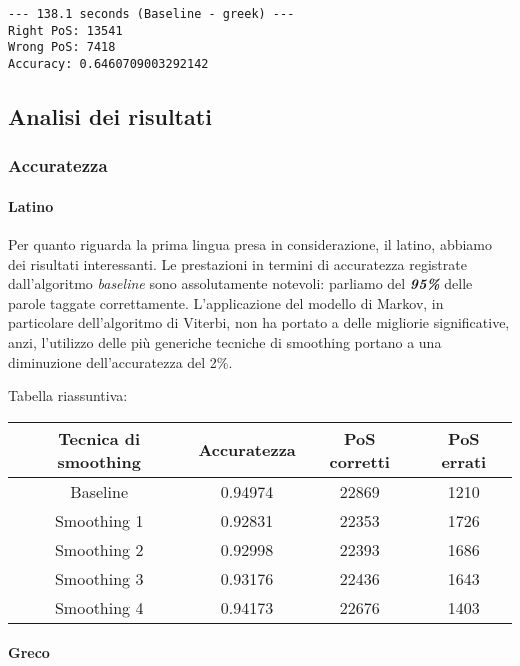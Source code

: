 \documentclass[11pt]{article}
\begin{document}
    \begin{Verbatim}[commandchars=\\\{\}]
--- 138.1 seconds (Baseline - greek) ---
Right PoS: 13541
Wrong PoS: 7418
Accuracy: 0.6460709003292142
    \end{Verbatim}

    \hypertarget{analisi-dei-risultati}{%
\subsection{Analisi dei risultati}\label{analisi-dei-risultati}}

\hypertarget{accuratezza}{%
\subsubsection{Accuratezza}\label{accuratezza}}

\hypertarget{latino}{%
\paragraph{Latino}\label{latino}}

Per quanto riguarda la prima lingua presa in considerazione, il latino,
abbiamo dei risultati interessanti. Le prestazioni in termini di
accuratezza registrate dall'algoritmo \emph{baseline} sono assolutamente
notevoli: parliamo del \textbf{\emph{95\%}} delle parole taggate
correttamente. L'applicazione del modello di Markov, in particolare
dell'algoritmo di Viterbi, non ha portato a delle migliorie
significative, anzi, l'utilizzo delle più generiche tecniche di
smoothing portano a una diminuzione dell'accuratezza del 2\%.

Tabella riassuntiva:

\begin{longtable}[]{@{}cccc@{}}
\toprule
Tecnica di smoothing & Accuratezza & PoS corretti & PoS errati \\
\midrule
\endhead
Baseline & 0.94974 & 22869 & 1210 \\
Smoothing 1 & 0.92831 & 22353 & 1726 \\
Smoothing 2 & 0.92998 & 22393 & 1686 \\
Smoothing 3 & 0.93176 & 22436 & 1643 \\
Smoothing 4 & 0.94173 & 22676 & 1403 \\
\bottomrule
\end{longtable}

\hypertarget{greco}{%
\paragraph{Greco}\label{greco}}
\end{document}
